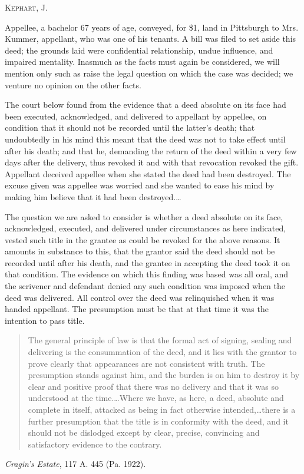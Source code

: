 
\opinion \textsc{Kephart}, J.

Appellee, a bachelor 67 years of age, conveyed, for \$1, land in Pittsburgh to
Mrs. Kummer, appellant, who was one of his tenants. A bill was filed to set
aside this deed; the grounds laid were confidential relationship, undue
influence, and impaired mentality. Inasmuch as the facts must again be
considered, we will mention only such as raise the legal question on which the
case was decided; we venture no opinion on the other facts.

The court below found from the evidence that a deed absolute on its face had
been executed, acknowledged, and delivered to appellant by appellee, on
condition that it should not be recorded until the latter's death; that
undoubtedly in his mind this meant that the deed was not to take effect until
after his death; and that he, demanding the return of the deed within a very
few days after the delivery, thus revoked it and with that revocation revoked
the gift. Appellant deceived appellee when she stated the deed had been
destroyed. The excuse given was appellee was worried and she wanted to ease his
mind by making him believe that it had been destroyed.\dots

The question we are asked to consider is whether a deed absolute on its face,
acknowledged, executed, and delivered under circumstances as here indicated,
vested such title in the grantee as could be revoked for the above reasons. It
amounts in substance to this, that the grantor said the deed should not be
recorded until after his death, and the grantee in accepting the deed took it
on that condition. The evidence on which this finding was based was all oral,
and the scrivener and defendant denied any such condition was imposed when the
deed was delivered. All control over the deed was relinquished when it was
handed appellant. The presumption must be that at that time it was the
intention to pass title.
\begin{quote}
The general principle of law is that the formal act
of signing, sealing and delivering is the consummation of the deed, and it lies
with the grantor to prove clearly that appearances are not consistent with
truth. The presumption stands against him, and the burden is on him to destroy
it by clear and positive proof that there was no delivery and that it was so
understood at the time.\dots Where we have, as here, a deed, absolute and
complete in itself, attacked as being in fact otherwise intended,\dots there
is a further presumption that the title is in conformity with the deed, and it
should not be dislodged except by clear, precise, convincing and satisfactory
evidence to the contrary.
\end{quote}
\textit{Cragin's Estate}, 117 A. 445 (Pa. 1922).

